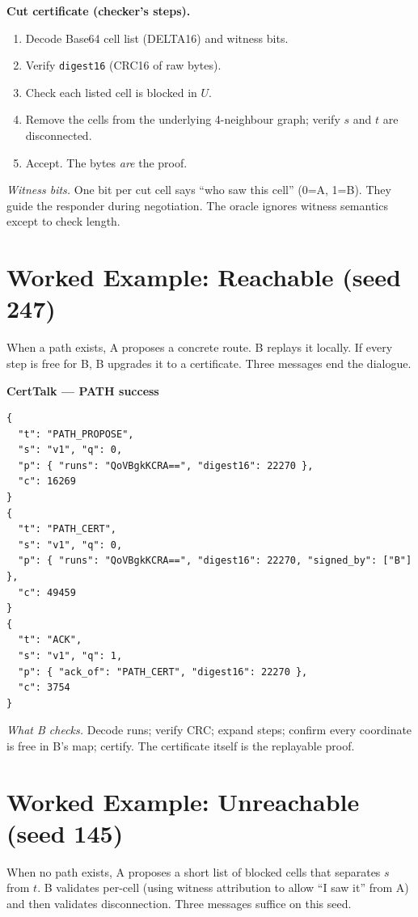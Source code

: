 \documentclass[11pt]{article}
\begin{document}
\textbf{Cut certificate (checker’s steps).}
\begin{enumerate}
  \item Decode Base64 cell list (DELTA16) and witness bits.\label{step:cut-decode}
  \item Verify \texttt{digest16} (CRC16 of raw bytes).\label{step:cut-crc}
  \item Check each listed cell is blocked in $U$.\label{step:cut-cells}
  \item Remove the cells from the underlying 4-neighbour graph; verify $s$ and $t$ are disconnected.\label{step:cut-disc}
  \item Accept. The bytes \emph{are} the proof.
\end{enumerate}

\vspace{6pt}
\textit{Witness bits.} One bit per cut cell says “who saw this cell” (0=A, 1=B). They guide the responder during negotiation. The oracle ignores witness semantics except to check length.

\section{Worked Example: Reachable (seed 247)}
When a path exists, A proposes a concrete route. B replays it locally. If every step is free for B, B upgrades it to a certificate. Three messages end the dialogue.

\textbf{CertTalk — PATH success}
\begin{lstlisting}
{
  "t": "PATH_PROPOSE",
  "s": "v1", "q": 0,
  "p": { "runs": "QoVBgkKCRA==", "digest16": 22270 },
  "c": 16269
}
{
  "t": "PATH_CERT",
  "s": "v1", "q": 0,
  "p": { "runs": "QoVBgkKCRA==", "digest16": 22270, "signed_by": ["B"] },
  "c": 49459
}
{
  "t": "ACK",
  "s": "v1", "q": 1,
  "p": { "ack_of": "PATH_CERT", "digest16": 22270 },
  "c": 3754
}
\end{lstlisting}
\textit{What B checks.} Decode runs; verify CRC; expand steps; confirm every coordinate is free in B’s map; certify. The certificate itself is the replayable proof.

\section{Worked Example: Unreachable (seed 145)}
When no path exists, A proposes a short list of blocked cells that separates $s$ from $t$. B validates per-cell (using witness attribution to allow “I saw it” from A) and then validates disconnection. Three messages suffice on this seed.
\end{document}
